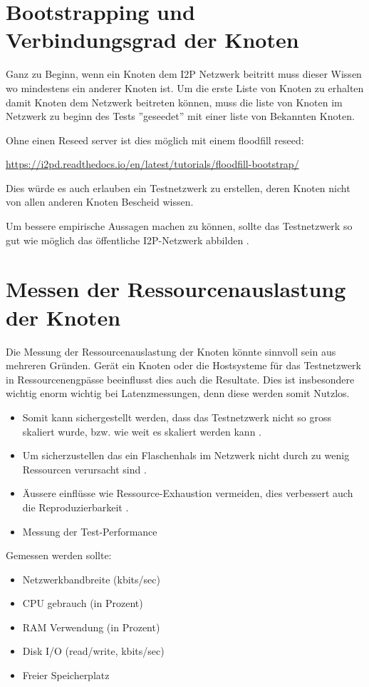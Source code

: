 
\section{Bootstrapping und Verbindungsgrad der Knoten}

Ganz zu Beginn, wenn ein Knoten dem I2P Netzwerk beitritt muss dieser Wissen wo mindestens ein anderer Knoten ist.
Um die erste Liste von Knoten zu erhalten damit Knoten dem Netzwerk beitreten können, muss die liste von Knoten im Netzwerk zu beginn des Tests ''geseedet'' mit einer liste von Bekannten Knoten.

Ohne einen Reseed server ist dies möglich mit einem floodfill reseed:

\url{https://i2pd.readthedocs.io/en/latest/tutorials/floodfill-bootstrap/}

Dies würde es auch erlauben ein Testnetzwerk zu erstellen, deren Knoten nicht von allen anderen Knoten Bescheid wissen.


Um bessere empirische Aussagen machen zu können, sollte das Testnetzwerk so gut wie möglich das öffentliche I2P-Netzwerk abbilden .


\section{Messen der Ressourcenauslastung der Knoten}


Die Messung der Ressourcenauslastung der Knoten könnte sinnvoll sein aus mehreren Gründen.
Gerät ein Knoten oder die Hostsysteme für das Testnetzwerk in Ressourcenengpässe beeinflusst dies auch die Resultate.
Dies ist insbesondere wichtig enorm wichtig bei Latenzmessungen, denn diese werden somit Nutzlos.

\begin{itemize}
    \item Somit kann sichergestellt werden, dass das Testnetzwerk nicht so gross skaliert wurde, bzw. wie weit es skaliert werden kann .
    \item Um sicherzustellen das ein Flaschenhals im Netzwerk nicht durch zu wenig Ressourcen verursacht sind .
    \item Äussere einflüsse wie Ressource-Exhaustion vermeiden, dies verbessert auch die Reproduzierbarkeit .
    \item Messung der Test-Performance
\end{itemize}

Gemessen werden sollte:

\begin{itemize}
    \item Netzwerkbandbreite (kbits/sec)
    \item CPU gebrauch (in Prozent)
    \item RAM Verwendung (in Prozent)
    \item Disk I/O (read/write, kbits/sec)
    \item Freier Speicherplatz
\end{itemize}
